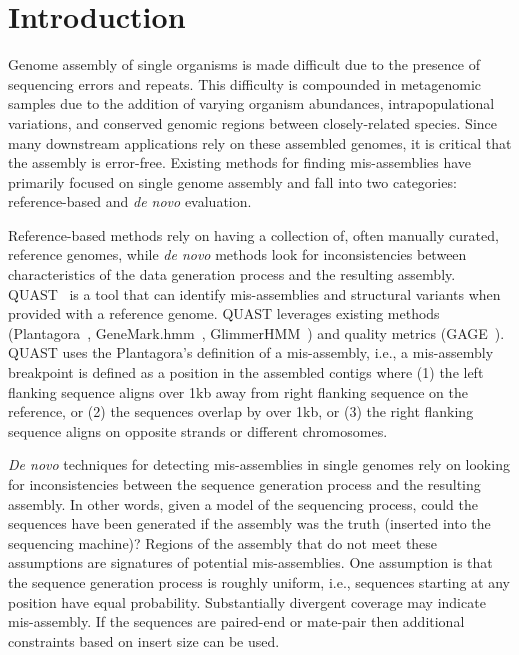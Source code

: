 \documentclass{bioinfo}
\begin{document}
\section{Introduction}

Genome assembly of single organisms is made difficult due to the presence of sequencing errors and repeats.
This difficulty is compounded in metagenomic samples due to the addition of varying organism abundances, intrapopulational variations, and conserved genomic regions between closely-related species.
Since many downstream applications rely on these assembled genomes, it is critical that the assembly is error-free.
Existing methods for finding mis-assemblies have primarily focused on single genome assembly and fall into two categories: reference-based and \emph{de novo} evaluation.

Reference-based methods rely on having a collection of, often manually curated, reference genomes, while \emph{de novo} methods look for inconsistencies between characteristics of the data generation process and the resulting assembly.
QUAST~\citep{gurevich2013quast} is a tool that can identify mis-assemblies and structural variants when provided with a reference genome.
QUAST leverages existing methods (Plantagora~\citep{barthelson2011plantagora},
GeneMark.hmm~\citep{lukashin1998genemark}, GlimmerHMM~\citep{majoros2004tigrscan}) and quality metrics (GAGE~\citep{salzberg2011gage}).
QUAST uses the Plantagora’s definition of a mis-assembly,
i.e., a mis-assembly breakpoint is defined as a position in the assembled contigs where (1) the left flanking
sequence aligns over 1kb away from right flanking sequence on the reference, or (2) the sequences overlap by
over 1kb, or (3) the right flanking sequence aligns on opposite strands or different chromosomes.

\emph{De novo} techniques for detecting mis-assemblies in single genomes rely on looking for inconsistencies between the sequence generation process and the resulting assembly.
In other words, given a model of the sequencing process, could the sequences have been generated if the assembly was the truth (inserted into the sequencing machine)?
Regions of the assembly that do not meet these assumptions are signatures of potential mis-assemblies.
One assumption is that the sequence generation process is roughly uniform, i.e., sequences starting at any position have equal probability.
Substantially divergent coverage may indicate mis-assembly.
If the sequences are paired-end or mate-pair then additional constraints based on insert size can be used.
\end{document}
